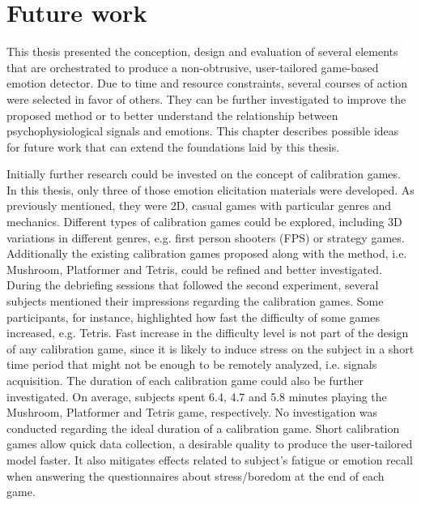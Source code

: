 \chapter{Future work}
\label{ch:closing}

This thesis presented the conception, design and evaluation of several elements that are orchestrated to produce a non-obtrusive, user-tailored game-based emotion detector. Due to time and resource constraints, several courses of action were selected in favor of others. They can be further investigated to improve the proposed method or to better understand the relationship between psychophysiological signals and emotions. This chapter describes possible ideas for future work that can extend the foundations laid by this thesis.

Initially further research could be invested on the concept of calibration games. In this thesis, only three of those emotion elicitation materials were developed. As previously mentioned, they were 2D, casual games with particular genres and mechanics. Different types of calibration games could be explored, including 3D variations in different genres, e.g. first person shooters (FPS) or strategy games. Additionally the existing calibration games proposed along with the method, i.e. Mushroom, Platformer and Tetris, could be refined and better investigated. During the debriefing sessions that followed the second experiment, several subjects mentioned their impressions regarding the calibration games. Some participants, for instance, highlighted how fast the difficulty of some games increased, e.g. Tetris. Fast increase in the difficulty level is not part of the design of any calibration game, since it is likely to induce stress on the subject in a short time period that might not be enough to be remotely analyzed, i.e. signals acquisition. The duration of each calibration game could also be further investigated. On average, subjects spent 6.4, 4.7 and 5.8 minutes playing the Mushroom, Platformer and Tetris game, respectively. No investigation was conducted regarding the ideal duration of a calibration game. Short calibration games allow quick data collection, a desirable quality to produce the user-tailored model faster. It also mitigates effects related to subject's fatigue or emotion recall when answering the questionnaires about stress/boredom at the end of each game.

